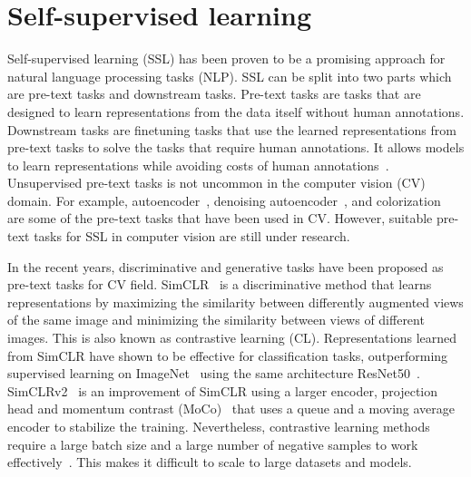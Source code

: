 \documentclass[a4paper,11pt,oneside]{report}
\begin{document}
\section{Self-supervised learning}
Self-supervised learning (SSL) has been proven to be a promising approach for natural language processing tasks (NLP). SSL can be split into two parts which are pre-text tasks and downstream tasks. Pre-text tasks are tasks that are designed to learn representations from the data itself without human annotations. Downstream tasks are finetuning tasks that use the learned representations from pre-text tasks to solve the tasks that require human annotations. It allows models to learn representations while avoiding costs of human annotations~\cite{Jaiswal2020}. Unsupervised pre-text tasks is not uncommon in the computer vision (CV) domain. For example, autoencoder~\cite{Hinton2006}, denoising autoencoder~\cite{Vincent2008}, and colorization~\cite{Larsson2017} are some of the pre-text tasks that have been used in CV. However, suitable pre-text tasks for SSL in computer vision are still under research.

In the recent years, discriminative and generative tasks have been proposed as pre-text tasks for CV field. SimCLR~\cite{Chen2020Simple} is a discriminative method that learns representations by maximizing the similarity between differently augmented views of the same image and minimizing the similarity between views of different images. This is also known as contrastive learning (CL). Representations learned from SimCLR have shown to be effective for classification tasks, outperforming supervised learning on ImageNet~\cite{Russakovsky2015} using the same architecture ResNet50~\cite{He2016}. SimCLRv2~\cite{Chen2020} is an improvement of SimCLR using a larger encoder, projection head and momentum contrast (MoCo)~\cite{He2020} that uses a queue and a moving average encoder to stabilize the training. Nevertheless, contrastive learning methods require a large batch size and a large number of negative samples to work effectively~\cite{Chen2020Simple}. This makes it difficult to scale to large datasets and models. 
\end{document}

